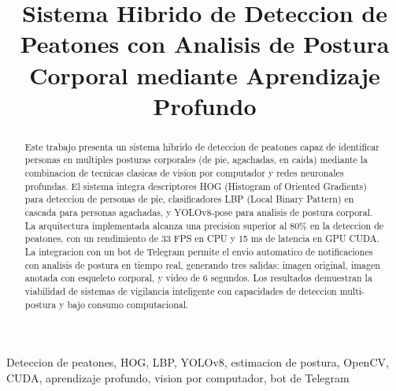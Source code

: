 \documentclass[conference]{IEEEtran}
\begin{document}
\title{Sistema Hibrido de Deteccion de Peatones con Analisis de Postura Corporal mediante Aprendizaje Profundo\\
{\footnotesize \textsuperscript{}}
}

\author{
\and
{}
}

\maketitle

\begin{abstract}
Este trabajo presenta un sistema hibrido de deteccion de peatones capaz de identificar personas en multiples posturas corporales (de pie, agachadas, en caida) mediante la combinacion de tecnicas clasicas de vision por computador y redes neuronales profundas. El sistema integra descriptores HOG (Histogram of Oriented Gradients) para deteccion de personas de pie, clasificadores LBP (Local Binary Pattern) en cascada para personas agachadas, y YOLOv8-pose para analisis de postura corporal. La arquitectura implementada alcanza una precision superior al 80\% en la deteccion de peatones, con un rendimiento de 33 FPS en CPU y 15 ms de latencia en GPU CUDA. La integracion con un bot de Telegram permite el envio automatico de notificaciones con analisis de postura en tiempo real, generando tres salidas: imagen original, imagen anotada con esqueleto corporal, y video de 6 segundos. Los resultados demuestran la viabilidad de sistemas de vigilancia inteligente con capacidades de deteccion multi-postura y bajo consumo computacional.
\end{abstract}

\begin{IEEEkeywords}
Deteccion de peatones, HOG, LBP, YOLOv8, estimacion de postura, OpenCV, CUDA, aprendizaje profundo, vision por computador, bot de Telegram
\end{IEEEkeywords}
\end{document}
